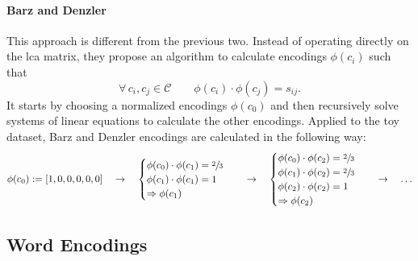 \paragraph{Barz and Denzler~\cite{HierarchyBasedBarz2018}}\label{par:encoding-bd}
This approach is different from the previous two. Instead of operating directly
on the \acrshort{lca} matrix, they propose an algorithm to calculate encodings
$\phi(c_i)$ such that
\begin{equation}
  \forall \, c_i, c_j \in \mathcal{C} \qquad
  \phi(c_i) \cdot \phi(c_j) = s_{ij}.
  \label{eq:bd-hierarchical-encoding}
\end{equation}
It starts by choosing a normalized encodings $\phi(c_0)$ and then recursively
solve systems of linear equations to calculate the other encodings.
Applied to the toy dataset, Barz and Denzler encodings are calculated in the
following way:
\begin{equation*}
  \phi{\left(c_0\right)} := \left[1, 0, 0, 0, 0, 0\right]
  \quad \rightarrow \quad
  \begin{cases}
    \phi{\left(c_0\right)} \cdot \phi{\left(c_1\right)} = \sfrac{2}{3} \\
    \phi{\left(c_1\right)} \cdot \phi{\left(c_1\right)} = 1 \\
    \Rightarrow  \phi{\left(c_1\right)}
  \end{cases}
  \quad \rightarrow \quad
  \begin{cases}
    \phi{\left(c_0\right)} \cdot \phi{\left(c_2\right)} = \sfrac{2}{3} \\
    \phi{\left(c_1\right)} \cdot \phi{\left(c_2\right)} = \sfrac{2}{3} \\
    \phi{\left(c_2\right)} \cdot \phi{\left(c_2\right)} = 1 \\
    \Rightarrow \phi{\left(c_2\right)}
  \end{cases}
  \quad \rightarrow \quad \ldots
\end{equation*}

\subsection{Word Encodings}
\label{subsec:word-encoding}

